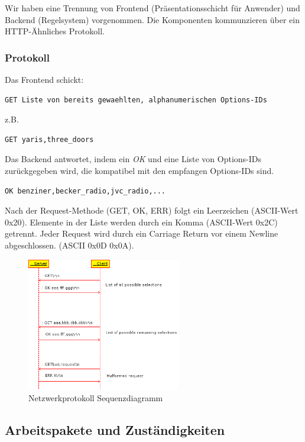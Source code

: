 \documentclass[a4paper,10pt]{article}
\begin{document}
Wir haben eine Trennung von Frontend (Präsentationsschicht für Anwender) und Backend (Regelsystem) vorgenommen.
Die Komponenten kommunzieren über ein HTTP-Ähnliches Protokoll.

\subsubsection{Protokoll}
Das Frontend schickt:

\begin{lstlisting}
GET Liste von bereits gewaehlten, alphanumerischen Options-IDs
\end{lstlisting}

z.B.

\begin{lstlisting}
GET yaris,three_doors
\end{lstlisting}

Das Backend antwortet, indem ein \textit{OK} und eine Liste von Options-IDs zurückgegeben wird, die kompatibel mit den empfangen Options-IDs sind.

\begin{lstlisting}
OK benziner,becker_radio,jvc_radio,...
\end{lstlisting}

Nach der Request-Methode (GET, OK, ERR) folgt ein Leerzeichen (ASCII-Wert 0x20). Elemente in der Liste werden durch ein Komma (ASCII-Wert 0x2C) getrennt.
Jeder Request wird durch ein Carriage Return vor einem Newline abgeschlossen. (ASCII 0x0D 0x0A).

\begin{figure}[htb]
	\centering
	\includegraphics[width=0.6\textwidth]{doc/netsequence.png}
	\caption{Netzwerkprotokoll Sequenzdiagramm}
	\label{fig:networkproto_sequence}
\end{figure}

\subsection*{Arbeitspakete und Zuständigkeiten}
\end{document}
